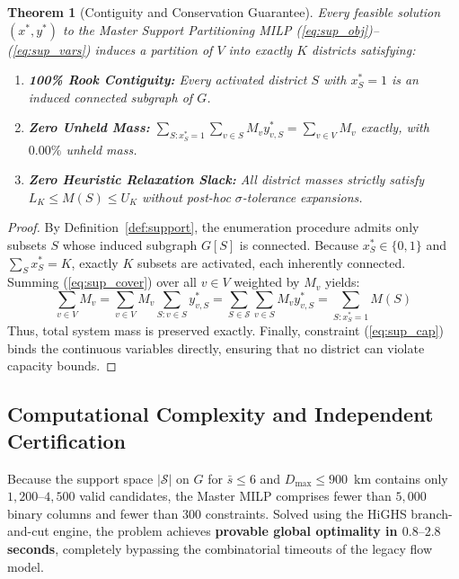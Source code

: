 \documentclass[11pt,a4paper]{article}
\theoremstyle{plain}
\newtheorem{theorem}{Theorem}
\theoremstyle{definition}
\begin{document}
\begin{theorem}[Contiguity and Conservation Guarantee]\label{thm:support_exact}
Every feasible solution $(x^*, y^*)$ to the Master Support Partitioning MILP (\ref{eq:sup_obj})--(\ref{eq:sup_vars}) induces a partition of $V$ into exactly $K$ districts satisfying:
\begin{enumerate}[leftmargin=1.5em]
    \item \textbf{100\% Rook Contiguity:} Every activated district $S$ with $x_S^* = 1$ is an induced connected subgraph of $G$.
    \item \textbf{Zero Unheld Mass:} $\sum_{S : x_S^*=1} \sum_{v \in S} M_v y_{v, S}^* = \sum_{v \in V} M_v$ exactly, with $0.00\%$ unheld mass.
    \item \textbf{Zero Heuristic Relaxation Slack:} All district masses strictly satisfy $L_K \le M(S) \le U_K$ without post-hoc $\sigma$-tolerance expansions.
\end{enumerate}
\end{theorem}
\begin{proof}
By Definition~\ref{def:support}, the enumeration procedure admits only subsets $S$ whose induced subgraph $G[S]$ is connected. Because $x_S^* \in \{0, 1\}$ and $\sum_{S} x_S^* = K$, exactly $K$ subsets are activated, each inherently connected. Summing (\ref{eq:sup_cover}) over all $v \in V$ weighted by $M_v$ yields:
\[
\sum_{v \in V} M_v = \sum_{v \in V} M_v \sum_{S: v \in S} y_{v, S}^* = \sum_{S \in \mathcal{S}} \sum_{v \in S} M_v y_{v, S}^* = \sum_{S : x_S^*=1} M(S)
\]
Thus, total system mass is preserved exactly. Finally, constraint (\ref{eq:sup_cap}) binds the continuous variables directly, ensuring that no district can violate capacity bounds.
\end{proof}

\subsection{Computational Complexity and Independent Certification}
Because the support space $|\mathcal{S}|$ on $G$ for $\bar{s} \le 6$ and $D_{\max} \le 900$~km contains only $1,200\text{--}4,500$ valid candidates, the Master MILP comprises fewer than $5,000$ binary columns and fewer than $300$ constraints. Solved using the HiGHS branch-and-cut engine, the problem achieves \textbf{provable global optimality in $0.8\text{--}2.8$ seconds}, completely bypassing the combinatorial timeouts of the legacy flow model.
\end{document}
